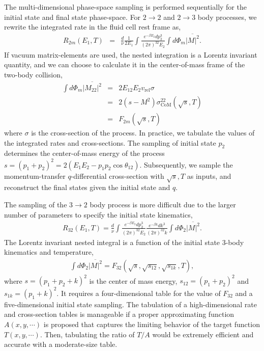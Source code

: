 The multi-dimensional phase-space sampling is performed sequentially for the initial state and final state phase-space.
For $2\rightarrow 2$ and $2\rightarrow 3$ body processes, we rewrite the integrated rate in the fluid cell rest frame as,
\begin{eqnarray}
R_{2m}(E_1, T) &=& \frac{d}{\nu} \frac{1}{2E_1}\int \frac{e^{-\beta E_2}dp_2^3}{(2\pi)^32E_2} 
\int d\Phi_m\overline{|M|^2}.
\end{eqnarray}
If vacuum matrix-elements are used, the nested integration is a Lorentz invariant quantity, and we can choose to calculate it in the center-of-mass frame of the two-body collision, 
\begin{eqnarray}
\int d\Phi_m\overline{|M_{22}|^2} &=& 2E_12E_2v_{\textrm{rel}}\sigma \nonumber \\
 &=& 2(s-M^2)\sigma_{\textrm{CoM}}^{22}(\sqrt{s}, T)\nonumber \\
  &=& F_{2m}(\sqrt{s}, T)
\end{eqnarray}
where $\sigma$ is the cross-section of the process.
In practice, we tabulate the values of the integrated rates and cross-sections. 
The sampling of initial state $p_2$ determines the center-of-mass energy of the process $s = (p_1+p_2)^2 = 2(E_1 E_2 - p_1p_2 \cos\theta_{12})$.
Subsequently, we sample the momentum-transfer $q$-differential cross-section with $\sqrt{s}, T$ as inputs, and reconstruct the final states given the initial state and $q$.

The sampling of the $3\rightarrow 2$ body process is more difficult due to the larger number of parameters to specify the initial state kinematics,
\begin{eqnarray}
R_{32}(E_1, T) = \frac{d}{\nu} \int \frac{e^{-\beta E_2}dp_2^3}{(2\pi)^32E_2} \frac{e^{-\beta k}dk^3}{(2\pi)^32k}
\int d\Phi_2\overline{|M|^2}.
\end{eqnarray}
The Lorentz invariant nested integral is a function of the initial state 3-body kinematics and temperature,
\begin{eqnarray}
\int d\Phi_2\overline{|M|^2} = F_{32}(\sqrt{s}, \sqrt{s_{12}}, \sqrt{s_{1k}}, T),
\end{eqnarray}
where $s = (p_1+p_2+k)^2$ is the center of mass energy, $s_{12} = (p_1+p_2)^2$ and $s_{1k} = (p_1+k)^2$.
It requires a four-dimensional table for the value of $F_{32}$ and a five-dimensional initial state sampling.
The tabulation of a high-dimensional rate and cross-section tables is manageable if a proper approximating function $A(x, y, \cdots)$ is proposed that captures the limiting behavior of the target function $T(x, y, \cdots)$.
Then, tabulating the ratio of $T/A$ would be extremely efficient and accurate with a moderate-size table.

